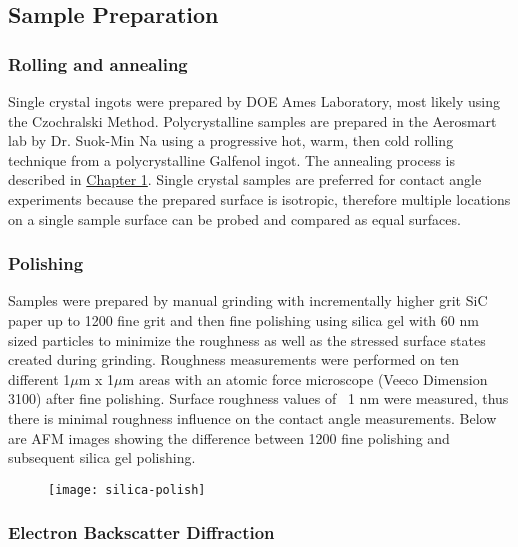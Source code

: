 \subsection{Sample Preparation}
\subsubsection{Rolling and annealing}
Single crystal ingots were prepared by DOE Ames Laboratory, most likely using the Czochralski Method. Polycrystalline samples are prepared in the Aerosmart lab by Dr. Suok-Min Na using a progressive hot, warm, then cold rolling technique from a polycrystalline Galfenol ingot. The annealing process is described in \hyperlink{abnormal-grain-growth}{Chapter 1}. Single crystal samples are preferred for contact angle experiments because the prepared surface is isotropic, therefore multiple locations on a single sample surface can be probed and compared as equal surfaces. 


\subsubsection{Polishing}


Samples were prepared by manual grinding with incrementally higher grit SiC paper up to 1200 fine grit and then fine polishing using silica gel with 60 nm sized particles to minimize the roughness as well as the stressed surface states created during grinding.\cite{Hoffmann1987} Roughness measurements were performed on ten different 1$\mu$m x 1$\mu$m areas with an atomic force microscope (Veeco Dimension 3100) after fine polishing. Surface roughness values of ~1 nm were measured, thus there is minimal roughness influence on the contact angle measurements. Below are AFM images showing the difference between 1200 fine polishing and subsequent silica gel polishing. 
\begin{figure}
	\centering
	\texttt{[image: silica-polish]}
	\caption{}
	\label{fig:silica-polish}
\end{figure}





\subsubsection{Electron Backscatter Diffraction}

